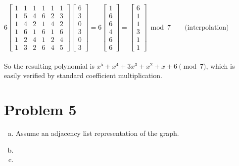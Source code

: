 \documentclass[11pt]{article}
\newcounter{problemnumber}
\begin{document}
\begin{enumerate}[(a)]
$6\begin{bmatrix}1&1&1&1&1&1\\1&5&4&6&2&3\\1&4&2&1&4&2\\1&6&1&6&1&6\\1&2&4&1&2&4\\1&3&2&6&4&5\end{bmatrix}\begin{bmatrix}6\\3\\0\\3\\0\\3\end{bmatrix} = 6\begin{bmatrix}1\\6\\6\\4\\6\\6\end{bmatrix} = \begin{bmatrix}6\\1\\1\\3\\1\\1\end{bmatrix}\bmod 7 \qquad \text{(interpolation)}$ \\\\
So the resulting polynomial is $x^5+x^4+3x^3+x^2+x+6 \pmod 7$, which is easily verified by standard coefficient multiplication.
\end{enumerate}


\newpage
\section*{Problem 5}
\begin{enumerate}[(a)]
\item Assume an adjacency list representation of the graph.
\item
\item
\end{enumerate}


\newpage
\end{document}
